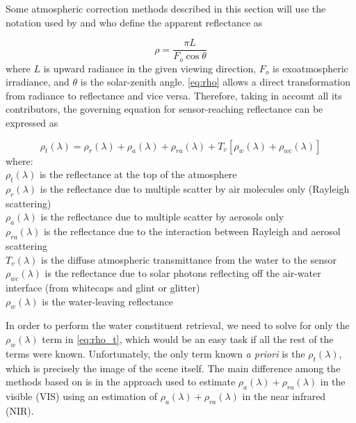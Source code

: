 Some atmospheric correction methods described in this section will use the notation used by \cite{Gordon:1994} and \cite{Ruddick:2000bs} who define the apparent reflectance as 

\begin{equation}\label{eq:rho}
  \rho = \frac{\pi L}{F_o \cos{\theta}}
\end{equation}
where $L$ is upward radiance in the given viewing direction, $F_o$ is exoatmospheric irradiance, and $\theta$ is the solar-zenith angle. \autoref{eq:rho} allows a direct transformation from radiance to reflectance and vice versa. Therefore, taking in account all its contributors, the governing equation for sensor-reaching reflectance can be expressed as

\begin{equation}\label{eq:rho_t}
  \rho_t(\lambda) = \rho_r(\lambda) + \rho_a(\lambda) + \rho_{ra}(\lambda) + T_v[\rho_w(\lambda) + \rho_{wc}(\lambda)]
\end{equation}
where:\\
\indent $\rho_t(\lambda)$ is the reflectance at the top of the atmosphere \\
\indent $\rho_r(\lambda)$ is the reflectance due to multiple scatter by air molecules only (Rayleigh scattering)\\
\indent $\rho_a(\lambda)$ is the reflectance due to multiple scatter by aerosols only\\
\indent $\rho_{ra}(\lambda)$ is the reflectance due to the interaction between Rayleigh and aerosol scattering\\
\indent $T_v(\lambda)$ is the diffuse atmospheric transmittance from the water to the sensor\\
\indent $\rho_{wc}(\lambda)$ is the reflectance due to solar photons reflecting off the air-water interface (from whitecaps and glint or glitter)\\
\indent $\rho_w(\lambda)$ is the water-leaving reflectance

In order to perform the water constituent retrieval, we need to solve for only the $\rho_w(\lambda)$ term in \autoref{eq:rho_t}, which would be an easy task if all the rest of the terms were known. Unfortunately, the only term known {\it a priori} is the $\rho_t(\lambda)$, which is precisely the image of the scene itself. The main difference among the methods based on \cite{Gordon:1994} is in the approach used to estimate $\rho_a(\lambda) + \rho_{ra}(\lambda)$ in the visible (VIS) using an estimation of $\rho_a(\lambda) + \rho_{ra}(\lambda)$ in the near infrared (NIR).

